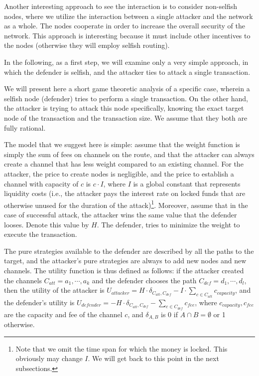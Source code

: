 Another interesting approach to see the interaction is to consider 
non-selfish nodes, where we utilize the interaction between a single attacker 
and the network as a whole. The nodes cooperate in order to increase the overall security of the network. This approach is interesting because it must include other incentives to the nodes
(otherwise they will employ selfish routing).

In the following, as a first step, 
we will examine only a very simple approach, 
in which the defender is selfish, and the attacker ties to attack a single transaction.

We will present here a short game theoretic analysis of a specific case, 
wherein a selfish node (defender) tries to perform a single transaction. 
On the other hand, the attacker is trying to attack this node specifically, 
knowing the exact target node of the transaction and the transaction size. 
We assume that they both are fully rational.

The model that we suggest here is simple: assume that the
weight function is simply the sum of fees on channels on the route, 
and that the attacker can always create a channel that has less weight 
compared to an existing channel. For the attacker, the price to create nodes 
is negligible, and the price to establish a channel with capacity of $c$ is $c \cdot I$, 
where $I$ is a global constant that represents liquidity costs (i.e., 
the attacker pays the interest rate on locked funds that are otherwise unused 
for the duration of the attack)\footnote{Note that we omit the time span for which 
the money is locked. This obviously may change $I$. We will get back to this point in the next subsections.}. Moreover, assume that in the case of successful attack, the attacker wins the same value that the defender looses. Denote this value by $H$. The defender, tries to minimize the weight to execute the transaction.

The pure strategies available to the defender are described by all the paths to the target, 
and the attacker's pure strategies are always to add new nodes and new channels.
The utility function is thus defined as follows: if the attacker created the channels $C_{att} = a_1, \cdots, a_k$ and the defender chooses the path $C_{def} = d_1, \cdots, d_l$, then the utility of the attacker is $U_{attacker} = H \cdot \delta_{C_{att}, C_{def}} - I \cdot \sum_{c \in C_{att}} c_{capacity}$, and the defender's utility is $U_{defender} = -H \cdot \delta_{C_{att}, C_{def}} - \sum_{c \in C_{def}} c_{fee}$, where $c_{capacity}, c_{fee}$ are the capacity and fee of the channel $c$, and $\delta_{A,B}$ is 0 if $A \cap B = \emptyset$ or 1 otherwise.

